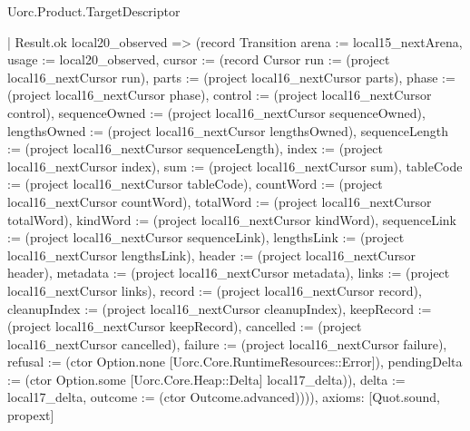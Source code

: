 \begin{lexlean}{Uorc.Product.TargetDescriptor}
\begin{semanticmodule}
{    | Result.ok local20_observed => (record Transition {arena := local15_nextArena, usage := local20_observed, cursor := (record Cursor {run := (project local16_nextCursor run), parts := (project local16_nextCursor parts), phase := (project local16_nextCursor phase), control := (project local16_nextCursor control), sequenceOwned := (project local16_nextCursor sequenceOwned), lengthsOwned := (project local16_nextCursor lengthsOwned), sequenceLength := (project local16_nextCursor sequenceLength), index := (project local16_nextCursor index), sum := (project local16_nextCursor sum), tableCode := (project local16_nextCursor tableCode), countWord := (project local16_nextCursor countWord), totalWord := (project local16_nextCursor totalWord), kindWord := (project local16_nextCursor kindWord), sequenceLink := (project local16_nextCursor sequenceLink), lengthsLink := (project local16_nextCursor lengthsLink), header := (project local16_nextCursor header), metadata := (project local16_nextCursor metadata), links := (project local16_nextCursor links), record := (project local16_nextCursor record), cleanupIndex := (project local16_nextCursor cleanupIndex), keepRecord := (project local16_nextCursor keepRecord), cancelled := (project local16_nextCursor cancelled), failure := (project local16_nextCursor failure), refusal := (ctor Option.none [Uorc.Core.RuntimeResources::Error]), pendingDelta := (ctor Option.some [Uorc.Core.Heap::Delta] local17_delta)}), delta := local17_delta, outcome := (ctor Outcome.advanced)}))),
  axioms: [Quot.sound, propext]
}


\end{semanticmodule}
\end{lexlean}
